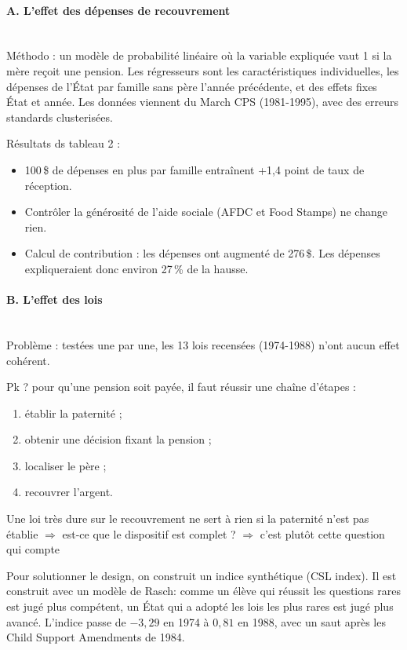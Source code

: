 \documentclass{article}
\begin{document}
\paragraph{A. L'effet des dépenses de recouvrement}\mbox{}\\

Méthodo : un modèle de probabilité linéaire où la variable expliquée vaut 1 si la mère reçoit une pension. Les régresseurs sont les caractéristiques individuelles, les dépenses de l'État par famille sans père l'année précédente, et des effets fixes État et année. Les données viennent du March CPS (1981-1995), avec des erreurs standards clusterisées.
 
\medskip
\noindent Résultats ds tableau 2 :
\begin{itemize}
    \item 100\,\$ de dépenses en plus par famille entraînent +1,4 point de taux de réception.
    \item Contrôler la générosité de l'aide sociale (AFDC et Food Stamps) ne change rien.
    \item Calcul de contribution : les dépenses ont augmenté de 276\,\$. Les dépenses expliqueraient donc environ 27\,\% de la hausse.
\end{itemize}
 
\paragraph{B. L'effet des lois}\mbox{}\\

Problème : testées une par une, les 13 lois recensées (1974-1988) n'ont aucun effet cohérent.
 
\medskip
\noindent Pk ? pour qu'une pension soit payée, il faut réussir une chaîne d'étapes :
\begin{enumerate}
    \item établir la paternité ;
    \item obtenir une décision fixant la pension ;
    \item localiser le père ;
    \item recouvrer l'argent.
\end{enumerate}
Une loi très dure sur le recouvrement ne sert à rien si la paternité n'est pas établie $\Rightarrow$ est-ce que le dispositif est complet ? $\Rightarrow$ c'est plutôt cette question qui compte
 
\medskip
\noindent Pour solutionner le design, on construit un indice synthétique (CSL index). Il est construit avec un modèle de Rasch: comme un élève qui réussit les questions rares est jugé plus compétent, un État qui a adopté les lois les plus rares est jugé plus avancé. L'indice passe de $-3{,}29$ en 1974 à $0{,}81$ en 1988, avec un saut après les Child Support Amendments de 1984.
 
\end{document}
